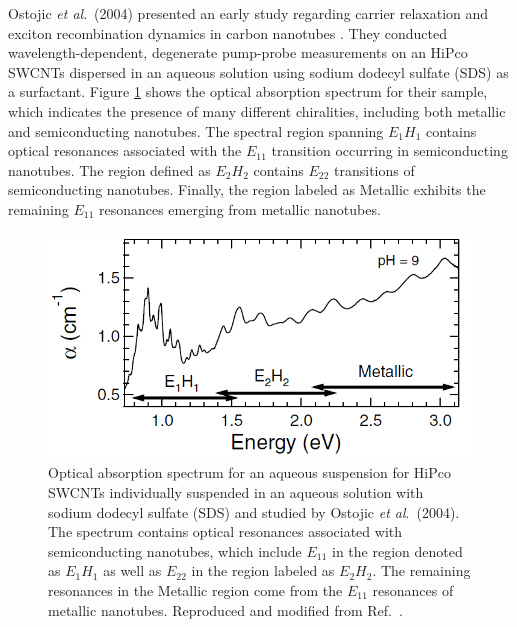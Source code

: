 Ostojic \textit{et al}.\ (2004) presented an early study regarding carrier relaxation and exciton recombination dynamics in carbon nanotubes \cite{ostojic2004interband}. They conducted wavelength-dependent, degenerate pump-probe measurements on an HiPco SWCNTs dispersed in an aqueous solution using sodium dodecyl sulfate (SDS) as a surfactant. %
Figure \ref{fig:abs_gordana} shows the optical absorption spectrum for their sample, which indicates the presence of many different chiralities, including both metallic and semiconducting nanotubes. The spectral region spanning $E_{1} H_{1}$ contains optical resonances associated with the $E_{11}$ transition occurring in semiconducting nanotubes. The region defined as $E_{2} H_{2}$ contains $E_{22}$ transitions of semiconducting nanotubes. Finally, the region labeled as Metallic exhibits the remaining $E_{11}$ resonances emerging from metallic nanotubes.

\begin{figure}[ht]
	\centering
	\includegraphics[scale=0.7]{images/chapter_prior_works/abs_gordana}

	\caption{Optical absorption spectrum for an aqueous suspension for HiPco SWCNTs individually suspended in an aqueous solution with sodium dodecyl sulfate (SDS) and studied by Ostojic \textit{et al}.\ (2004). The spectrum contains optical resonances associated with semiconducting nanotubes, which include $E_{11}$ in the region denoted as $E_{1} H_{1}$ as well as  $E_{22}$ in the region labeled as $E_{2} H_{2}$. The remaining resonances in the Metallic region come from the $E_{11}$ resonances of metallic nanotubes. Reproduced and modified from Ref.\ \cite{ostojic2004interband}.}
	\label{fig:abs_gordana}
\end{figure}

